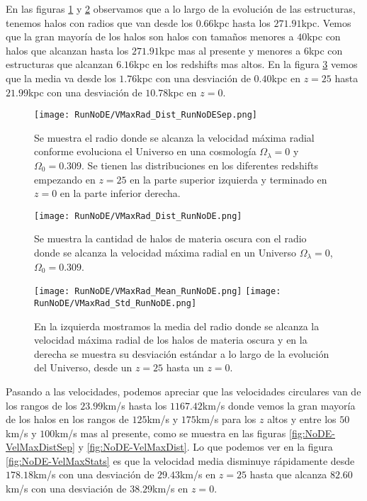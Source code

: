 En las figuras \ref{fig:NoDE-VMaxRadDistSep} y \ref{fig:NoDE-VMaxRadDist} observamos que a lo largo de la evolución de las estructuras, tenemos halos con radios que van desde los $0.66$kpc hasta los $271.91$kpc. Vemos que la gran mayoría de los halos son halos con tamaños menores a $40$kpc con halos que alcanzan hasta los $271.91$kpc mas al presente y menores a $6$kpc con estructuras que alcanzan $6.16$kpc en los redshifts mas altos. En la figura \ref{fig:NoDE-VMaxRadStats} vemos que la media va desde los $1.76$kpc con una desviación de $0.40$kpc en $z=25$ hasta $21.99$kpc con una desviación de $10.78$kpc en $z=0$.

\begin{figure}[H]
    \centering
    \texttt{[image: RunNoDE/VMaxRad\_Dist\_RunNoDESep.png]}
    \caption[Radio donde se alcanza la velocidad máxima radial]{\footnotesize Se muestra el radio donde se alcanza la velocidad máxima radial conforme evoluciona el Universo en una cosmología $\Omega_\lambda = 0$ y $\Omega_0 = 0.309$. Se tienen las distribuciones en los diferentes redshifts empezando en $z=25$ en la parte superior izquierda y terminado en $z=0$ en la parte inferior derecha.}
    \label{fig:NoDE-VMaxRadDistSep}
\end{figure}

\begin{figure}[H]
    \centering
    \texttt{[image: RunNoDE/VMaxRad\_Dist\_RunNoDE.png]}
    \caption[Distribución del radio donde se alcanza la velocidad máxima radial]{\footnotesize Se muestra la cantidad de halos de materia oscura con el radio donde se alcanza la velocidad máxima radial en un Universo $\Omega_\lambda = 0$, $\Omega_0 = 0.309$.}
    \label{fig:NoDE-VMaxRadDist}
\end{figure}

\begin{figure}[H]
    \centering
    \texttt{[image: RunNoDE/VMaxRad\_Mean\_RunNoDE.png]}
    \texttt{[image: RunNoDE/VMaxRad\_Std\_RunNoDE.png]}
    \caption[Media y desviación estándar del Radio donde se alcanza la velocidad máxima radial]{\footnotesize En la izquierda mostramos la media del radio donde se alcanza la velocidad máxima radial de los halos de materia oscura y en la derecha se muestra su desviación estándar a lo largo de la evolución del Universo, desde un $z=25$ hasta un $z=0$.}
    \label{fig:NoDE-VMaxRadStats}
\end{figure}


Pasando a las velocidades, podemos apreciar que las velocidades circulares van de los rangos de los $23.99$km/s hasta los $1167.42$km/s donde vemos la gran mayoría de los halos en los rangos de $125$km/s y $175$km/s para los $z$ altos y entre los $50$km/s y $100$km/s mas al presente, como se muestra en las figuras \ref{fig:NoDE-VelMaxDistSep} y \ref{fig:NoDE-VelMaxDist}. Lo que podemos ver en la figura \ref{fig:NoDE-VelMaxStats} es que la velocidad media disminuye rápidamente desde $178.18$km/s con una desviación de $29.43$km/s en $z=25$ hasta que alcanza $82.60$km/s con una desviación de $38.29$km/s en $z=0$.

